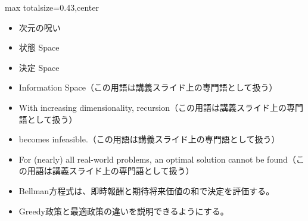 \clearpage
{}
\begin{minipage}[t]{0.405\textwidth}
\begin{adjustbox}{max totalsize={\textwidth}{0.43\textheight},center}
\begin{minipage}{\textwidth}\scriptsize
{}\begin{itemize}
\item 次元の呪い
\item 状態 Space
\item 決定 Space
\item Information Space（この用語は講義スライド上の専門語として扱う）
\item With increasing dimensionality, recursion（この用語は講義スライド上の専門語として扱う）
\item becomes infeasible.（この用語は講義スライド上の専門語として扱う）
\item For (nearly) all real-world problems, an optimal solution cannot be found（この用語は講義スライド上の専門語として扱う）
\end{itemize}\begin{itemize}
\item Bellman方程式は、即時報酬と期待将来価値の和で決定を評価する。
\item Greedy政策と最適政策の違いを説明できるようにする。
\end{itemize}
\end{minipage}
\end{adjustbox}
\end{minipage}\hfill
